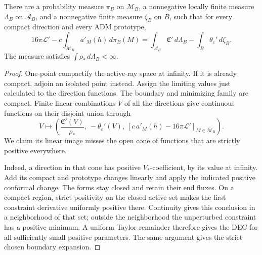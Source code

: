 \begin{lemma}\label{va:separation}
There are a probability measure \(\pi_B\) on \(\mathcal M_B\), a
nonnegative locally finite measure \(\Lambda_B\) on \(\mathcal A_B\),
and a nonnegative finite measure \(\zeta_B\) on \(B\), such that
for every compact direction and every ADM prototype,
\begin{equation}\label{va:multiplier}
 16\pi\mathcal L'-c\int_{\mathcal M_B}a'_M(h)\,d\pi_B(M)
 =\int_{\mathcal A_B}\mathfrak C'\,d\Lambda_B
                         -\int_B\theta_\varepsilon'\,d\zeta_B.
\end{equation}
The measure satisfies \(\int\rho_*\,d\Lambda_B<\infty\).
\end{lemma}
\begin{proof}
One-point compactify the active-ray space at infinity.  If it is already
compact, adjoin an isolated point instead.  Assign the limiting values
just calculated to the direction functions.  The boundary and minimizing
family are compact.  Finite linear combinations \(V\) of all the
directions give continuous functions on their disjoint union through
\begin{equation}\label{va:separation-map}
 V\longmapsto\left(
 \frac{\mathfrak C'(V)}{\rho_*},\ -\theta_\varepsilon'(V),\
 \left[c\,a'_M(h)-16\pi\mathcal L'\right]_{M\in\mathcal M_B}
 \right).
\end{equation}
We claim its linear image misses the open cone of functions that are
strictly positive everywhere.

Indeed, a direction in that cone has positive \(V_*\)-coefficient, by
its value at infinity.  Add its compact and prototype changes linearly
and apply the indicated positive conformal change.  The forms stay closed
and retain their end fluxes.  On a compact region, strict positivity on
the closed active set makes the first constraint derivative uniformly
positive there.  Continuity gives this conclusion in a neighborhood of
that set; outside the neighborhood the unperturbed constraint has a
positive minimum.  A uniform Taylor remainder therefore gives the DEC
for all sufficiently small positive parameters.  The same argument gives
the strict chosen boundary expansion.


\end{proof}

